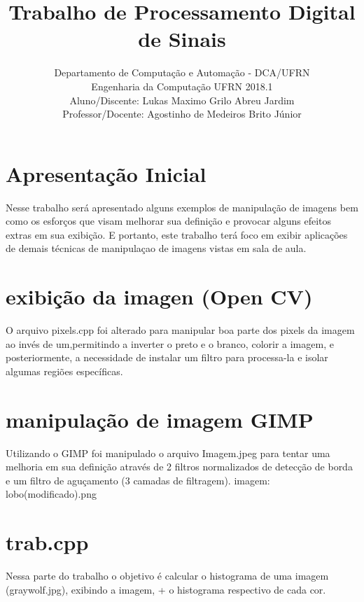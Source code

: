 \documentclass{article}
\title{Trabalho de Processamento Digital de Sinais}
\author{Departamento de Computação e Automação - DCA/UFRN\\
Engenharia da Computação UFRN 2018.1\\
Aluno/Discente: Lukas Maximo Grilo Abreu Jardim\\
Professor/Docente: Agostinho de Medeiros Brito Júnior}
\begin{document}
	\maketitle
	\newpage
	\section{Apresentação Inicial}
	\vspace{5mm}
	Nesse trabalho será apresentado alguns exemplos de manipulação de imagens bem como os esforços que visam melhorar sua definição e provocar alguns efeitos extras em sua exibição. E portanto, este trabalho terá foco em exibir aplicações de demais técnicas de manipulaçao de imagens vistas em sala de aula.
	\newpage
	\section{exibição da imagen (Open CV)}
	O arquivo pixels.cpp foi alterado para manipular boa parte dos pixels da imagem ao invés de um,permitindo a inverter o preto e o branco, colorir a imagem, e posteriormente, a necessidade de instalar um filtro para processa-la e isolar algumas regiões específicas.
	\vspace{5mm}
	\section{manipulação de imagem GIMP}
	\vspace{5mm}
	Utilizando o GIMP foi manipulado o arquivo Imagem.jpeg para tentar uma melhoria em sua definição através de 2 filtros normalizados de detecção de borda e um filtro de aguçamento (3 camadas de filtragem).
	imagem: lobo(modificado).png
	\vspace{5mm}
	\section{trab.cpp}
	\vspace{5mm}
	Nessa parte do trabalho o objetivo é calcular o histograma de uma imagem (graywolf.jpg), exibindo a imagem, + o histograma respectivo de cada cor.\\
\end{document}
